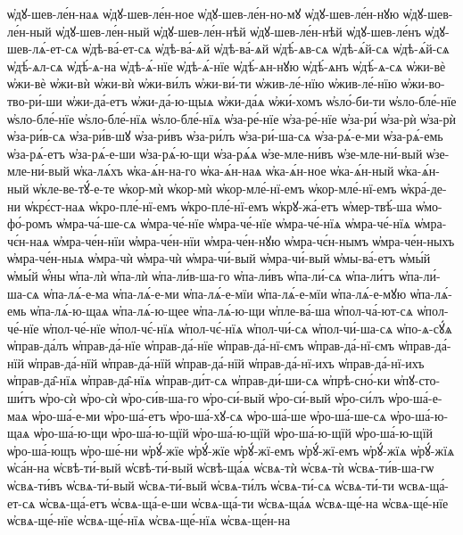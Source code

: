 {ѡ҆дꙋ-шев-ле́н-наѧ
ѡ҆дꙋ-шев-ле́н-ное
ѡ҆дꙋ-шев-ле́н-но-мꙋ
ѡ҆дꙋ-шев-ле́н-нꙋю
ѡ҆дꙋ-шев-ле́н-ный
ѡ҆дꙋ-шев-ле́н-ный
ѡ҆дꙋ-шев-ле́н-нѣй
ѡ҆дꙋ-шев-ле́н-нѣй
ѡ҆дꙋ-шев-ле́нъ
ѡ҆дꙋ-шев-лѧ́-ет-сѧ
ѡ҆дѣ-ва́-ет-сѧ
ѡ҆дѣ-ва́-ѧй
ѡ҆дѣ-ва́-ѧй
ѡ҆дѣ́-ѧв-сѧ
ѡ҆дѣ-ѧ́й-сѧ
ѡ҆дѣ-ѧ́й-сѧ
ѡ҆дѣ́-ѧл-сѧ
ѡ҆дѣ́-ѧ-на
ѡ҆дѣ-ѧ́-нїе
ѡ҆дѣ-ѧ́-нїе
ѡ҆дѣ́-ѧн-нꙋю
ѡ҆дѣ́-ѧнъ
ѡ҆дѣ́-ѧ-сѧ
ѡ҆жи-вѐ
ѡ҆жи-вѐ
ѡ҆жи-вѝ
ѡ҆жи-вѝ
ѡ҆жи-ви́лъ
ѡ҆жи-ви́-ти
ѡ҆жив-ле́-нїю
ѡ҆жив-ле́-нїю
ѡ҆жи-во-тво-ри́-ши
ѡ҆жи-да́-етъ
ѡ҆жи-да́-ю-щыѧ
ѡ҆жи-да́ѧ
ѡ҆жи́-хомъ
ѡ҆ѕло́-би-ти
ѡ҆ѕло-бле́-нїе
ѡ҆ѕло-бле́-нїе
ѡ҆ѕло-бле́-нїѧ
ѡ҆ѕло-бле́-нїѧ
ѡ҆за-ре́-нїе
ѡ҆за-ре́-нїе
ѡ҆за-ри́
ѡ҆за-рѝ
ѡ҆за-рѝ
ѡ҆за-ри́в-сѧ
ѡ҆за-ри́в-шꙋ
ѡ҆за-ри́въ
ѡ҆за-ри́лъ
ѡ҆за-ри́-ша-сѧ
ѡ҆за-рѧ́-е-ми
ѡ҆за-рѧ́-емь
ѡ҆за-рѧ́-етъ
ѡ҆за-рѧ́-е-ши
ѡ҆за-рѧ́-ю-щи
ѡ҆за-рѧ́ѧ
ѡ҆зе-мле-ни́въ
ѡ҆зе-мле-ни́-вый
ѡ҆зе-мле-ни́-вый
ѡ҆ка-лѧ́хъ
ѡ҆ка-ѧ́н-на-го
ѡ҆ка-ѧ́н-наѧ
ѡ҆ка-ѧ́н-ное
ѡ҆ка-ѧ́н-ный
ѡ҆ка-ѧ́н-ный
ѡ҆кле-ве-тꙋ́-е-те
ѡ҆кор-мѝ
ѡ҆кор-мѝ
ѡ҆кор-мле́-нї-емъ
ѡ҆кор-мле́-нї-емъ
ѡ҆кра́-де-ни
ѡ҆крє́ст-наѧ
ѡ҆кро-пле́-нї-емъ
ѡ҆кро-пле́-нї-емъ
ѡ҆крꙋ-жа́-етъ
ѡ҆мер-твѣ́-ша
ѡ҆мо-фо́-ромъ
ѡ҆мра-ча́-ше-сѧ
ѡ҆мра-че́-нїе
ѡ҆мра-че́-нїе
ѡ҆мра-че́-нїѧ
ѡ҆мра-че́-нїѧ
ѡ҆мра-чє́н-наѧ
ѡ҆мра-че́н-нїи
ѡ҆мра-че́н-нїи
ѡ҆мра-че́н-нꙋю
ѡ҆мра-чє́н-нымъ
ѡ҆мра-че́н-ныхъ
ѡ҆мра-че́н-ныѧ
ѡ҆мра-чѝ
ѡ҆мра-чѝ
ѡ҆мра-чи́-вый
ѡ҆мра-чи́-вый
ѡ҆мы-ва́-етъ
ѡ҆мы́й
ѡ҆мы́й
ѡ҆́ны
ѡ҆па-лѝ
ѡ҆па-лѝ
ѡ҆па-ли́в-ша-го
ѡ҆па-ли́въ
ѡ҆па-ли́-сѧ
ѡ҆па-ли́тъ
ѡ҆па-ли́-ша-сѧ
ѡ҆па-лѧ́-е-ма
ѡ҆па-лѧ́-е-ми
ѡ҆па-лѧ́-е-мїи
ѡ҆па-лѧ́-е-мїи
ѡ҆па-лѧ́-е-мꙋю
ѡ҆па-лѧ́-емь
ѡ҆па-лѧ́-ю-щаѧ
ѡ҆па-лѧ́-ю-щее
ѡ҆па-лѧ́-ю-щи
ѡ҆пле-ва́-ша
ѡ҆пол-ча́-ют-сѧ
ѡ҆пол-че́-нїе
ѡ҆пол-че́-нїе
ѡ҆пол-чє́-нїѧ
ѡ҆пол-чє́-нїѧ
ѡ҆пол-чи́-сѧ
ѡ҆пол-чи́-ша-сѧ
ѡ҆по-ѧ-сꙋ́ѧ
ѡ҆прав-да́лъ
ѡ҆прав-да́-нїе
ѡ҆прав-да́-нїе
ѡ҆прав-да́-нї-ємъ
ѡ҆прав-да́-нї-ємъ
ѡ҆прав-да́-нїй
ѡ҆прав-да́-нїй
ѡ҆прав-да́-нїй
ѡ҆прав-да́-нїй
ѡ҆прав-да́-нї-ихъ
ѡ҆прав-да́-нї-ихъ
ѡ҆прав-да̑-нїѧ
ѡ҆прав-да̑-нїѧ
ѡ҆прав-ди́т-сѧ
ѡ҆прав-ди́-ши-сѧ
ѡ҆прѣ-сно́-ки
ѡ҆пꙋ-сто-ши́тъ
ѡ҆ро-сѝ
ѡ҆ро-сѝ
ѡ҆ро-си́в-ша-го
ѡ҆ро-си́-вый
ѡ҆ро-си́-вый
ѡ҆ро-си́лъ
ѡ҆ро-ша́-е-маѧ
ѡ҆ро-ша́-е-ми
ѡ҆ро-ша́-етъ
ѡ҆ро-ша́-хꙋ-сѧ
ѡ҆ро-ша́-ше
ѡ҆ро-ша́-ше-сѧ
ѡ҆ро-ша́-ю-щаѧ
ѡ҆ро-ша́-ю-щи
ѡ҆ро-ша́-ю-щїй
ѡ҆ро-ша́-ю-щїй
ѡ҆ро-ша́-ю-щїй
ѡ҆ро-ша́-ю-щїй
ѡ҆ро-ша́-ющъ
ѡ҆ро-ше́-ни
ѡ҆рꙋ́-жїе
ѡ҆рꙋ́-жїе
ѡ҆рꙋ́-жї-емъ
ѡ҆рꙋ́-жї-емъ
ѡ҆рꙋ́-жїѧ
ѡ҆рꙋ́-жїѧ
ѡ҆са́н-на
ѡ҆свѣ-ти́-вый
ѡ҆свѣ-ти́-вый
ѡ҆свѣ-ща́ѧ
ѡ҆свѧ-тѝ
ѡ҆свѧ-тѝ
ѡ҆свѧ-ти́в-ша-гѡ
ѡ҆свѧ-ти́въ
ѡ҆свѧ-ти́-вый
ѡ҆свѧ-ти́-вый
ѡ҆свѧ-ти́лъ
ѡ҆свѧ-ти́-сѧ
ѡ҆свѧ-ти́-ти
ѡсвѧ-ща́-ет-сѧ
ѡ҆свѧ-ща́-етъ
ѡ҆свѧ-ща́-е-ши
ѡ҆свѧ-ща́-ти
ѡ҆свѧ-ща́ѧ
ѡ҆свѧ-ще́-на
ѡ҆свѧ-ще́-нїе
ѡ҆свѧ-ще́-нїе
ѡ҆свѧ-ще́-нїѧ
ѡ҆свѧ-ще́-нїѧ
ѡ҆свѧ-ще́н-на
}
